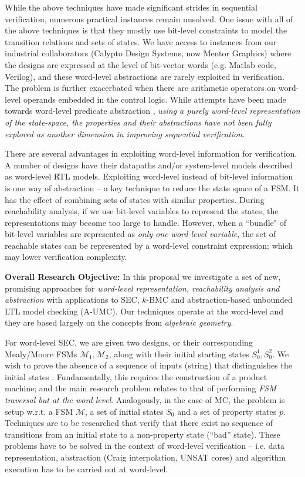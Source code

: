 While the above techniques have made significant strides in sequential
verification, numerous practical instances remain unsolved. One issue
with all of the above techniques is that they mostly use bit-level
constraints to model the transition relations and sets of 
states. We have access to instances from our industrial
collaborators (Calypto Design Systems, now Mentor Graphics) where
the designs are expressed at the level of bit-vector words
(e.g. Matlab code, Verilog), and these word-level abstractions are
rarely exploited in verification. The problem is further exacerbated
when there are arithmetic operators on word-level operands embedded in
the control logic. While attempts have been made towards word-level
predicate abstraction \cite{Jain05wordlevel} \cite{mcmillan:cav06}
\cite{mcmillan:impact}, {\it using a purely word-level representation
  of the state-space, the properties and their abstractions have not
  been fully explored as another dimension in improving sequential
  verification.}  

There are several advantages in exploiting word-level information for
verification. A number of designs have  their
datapaths and/or system-level models described as word-level RTL
models.  Exploiting word-level instead of bit-level information is one
way of abstraction -- a key technique to reduce the state space of a
FSM. It has the effect of combining sets of states with similar 
properties. During reachability analysis, if we use bit-level
variables to  represent the states, the representations may become too
large to handle. However, when a ``bundle" of bit-level variables are
represented as {\it only one word-level variable}, the set of
reachable states can be represented by a  word-level constraint
expression; which may lower verification complexity.


{\bf Overall Research Objective:} In this proposal we investigate a
set of new, promising approaches for {\it word-level representation,
reachability analysis and abstraction} with applications to SEC,
$k$-BMC and abstraction-based unbounded LTL model checking
(A-UMC). Our techniques operate at the word-level and they are based
largely on the concepts from {\it algebraic geometry}. 

For word-level SEC, we are given two designs, or their corresponding
Mealy/Moore FSMs ${\mathcal{M}}_1,{\mathcal{M}}_2$, along with their
initial starting states $S_0^1,S_0^2$. We wish to prove the absence of
a sequence of inputs (string) that distinguishes the initial
states \cite{coudert:iccad90}
\cite{coudert1990verification}. Fundamentally, this requires 
the construction of a product machine; and the main research problem
relates to that of performing {\it FSM traversal \cite{touati:iccad90}
but  at the word-level}. Analogously, in the case of MC, the problem
is setup w.r.t. a FSM $\mathcal{M}$, a set of initial states $S_0$ and
a set of property states $p$. Techniques are to be researched that
verify that there exist no sequence of transitions from an initial
state to a non-property state (``bad'' state). These problems have to
be solved in the context of word-level verification -- i.e. data
representation, abstraction (Craig interpolation, UNSAT cores) and
algorithm execution has to be carried out at word-level.   

